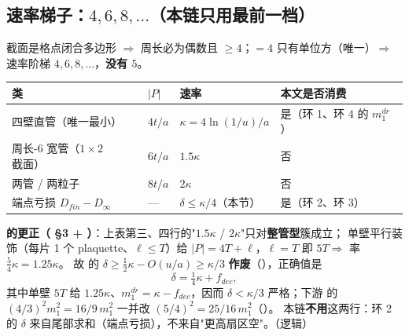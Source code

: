 \subsection{速率梯子：$4,6,8,\dots$（本链只用最前一档）}

截面是格点闭合多边形 $\Rightarrow$ 周长必为偶数且 $\ge4$；$=4$ 只有单位方（唯一）$\Rightarrow$ 速率阶梯 $4,6,8,\dots$，\textbf{没有 $5$}。

\begin{center}
\small
\begin{tabularx}{\textwidth}{@{}L{0.30\textwidth} L{0.16\textwidth} L{0.17\textwidth} L{0.28\textwidth}@{}}
\toprule
类 & $|P|$ & 速率 & 本文是否消费 \\
\midrule
四壁直管（唯一最小） & $4t/a$ & $\kappa=4\ln(1/u)/a$ & 是（环 1、环 4 的 $m_1^{dr}$） \\
周长-6 宽管（$1\times2$ 截面） & $6t/a$ & $1.5\kappa$ & 否 \\
两管 / 两粒子 & $8t/a$ & $2\kappa$ & 否 \\
端点亏损 $D_{fin}-D_\infty$ & --- & $\delta\le\kappa/4$（本节） & 是（环 2、环 3） \\
\bottomrule
\end{tabularx}
\end{center}

\LM{} \textbf{ 的更正（ \S3 + ）}：上表第三、四行的"$1.5\kappa$ / $2\kappa$"只对\textbf{整管型}簇成立；
单壁平行装饰（每片 1 个 plaquette、$\ell\le T$）给 $|P|=4T+\ell$，$\ell=T$ 即 $5T\Rightarrow$ 率 $\tfrac54\kappa=1.25\kappa$。
故  的 $\delta\ge\tfrac12\kappa-O(u/a)\ge\kappa/3$ \textbf{作废}（），正确值是
\[
\delta=\tfrac14\kappa+f_{dec},
\]
其中单壁 $5T$ 给 $1.25\kappa$、$m_1^{dr}=\kappa-f_{dec}$，因而 $\delta<\kappa/3$ 严格；下游  的 $(4/3)^2m_1^2=16/9\,m_1^2$ 一并改 $(5/4)^2=25/16\,m_1^2$（）。
本链\textbf{不用}这两行：环 2 的 $\delta$ 来自尾部求和（端点亏损），不来自"更高扇区空"。\LT{}（逻辑）

